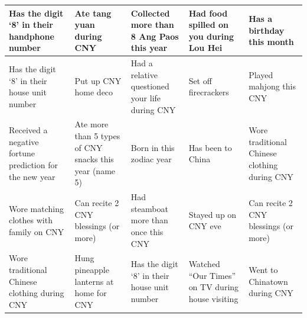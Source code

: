 \documentclass[20pt,A4]{article}
\begin{document}
\hphantom
\newline
\newline
\newline
\newline
\newline
\newline
\newline
\newline

\begin{center}
\large \bfseries
\begin{tabular}{| C{2.8cm}| C{2.8cm}| C{2.8cm}| C{2.8cm}| C{2.8cm}|} \hline  
Has the digit ‘8’ in their handphone number & Ate tang yuan during CNY &  Collected more than 8 Ang Paos this year  & Had food spilled on you during Lou Hei  & Has a birthday this month \\[2cm]
\hline 
 Has the digit ‘8’ in their house unit number & Put up CNY home deco & Had a relative questioned your life during CNY  & Set off firecrackers   & Played mahjong this CNY \\ [2cm]
\hline 
Received a negative fortune prediction for the new year & Ate more than 5 types of CNY snacks this year (name 5) & Born in this zodiac year  & Has been to China  & Wore traditional Chinese clothing during CNY \\ [2cm]
\hline 
 Wore matching clothes with family on CNY  & Can recite 2 CNY blessings (or more) & Had steamboat more than once this CNY  & Stayed up on CNY eve & Can recite 2 CNY blessings (or more) \\ [2cm]
\hline 
 Wore traditional Chinese clothing during CNY & Hung pineapple lanterns at home for CNY & Has the digit ‘8’ in their house unit number  & Watched “Our Times” on TV during house visiting  & Went to Chinatown during CNY \\ [2cm]
\hline 
 \end{tabular}
\end{center}
\end{document}
